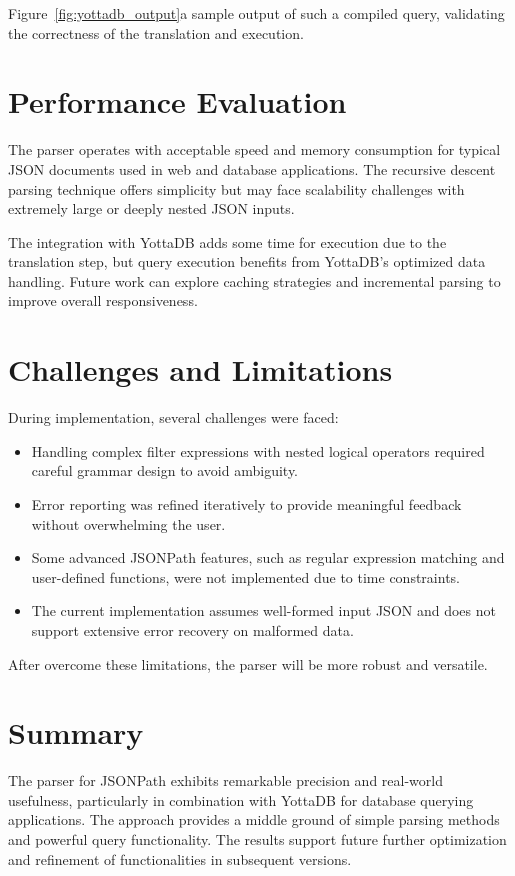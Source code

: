Figure~\ref{fig:yottadb_output}a sample output of such a compiled query, validating the correctness of the translation and execution.

\section{Performance Evaluation}

The parser operates with acceptable speed and memory consumption for typical JSON documents used in web and database applications. The recursive descent parsing technique offers simplicity but may face scalability challenges with extremely large or deeply nested JSON inputs.

The integration with YottaDB adds some time for execution due to the translation step, but query execution benefits from YottaDB’s optimized data handling. Future work can explore caching strategies and incremental parsing to improve overall responsiveness.

\section{Challenges and Limitations}

During implementation, several challenges were faced:

\begin{itemize}
	\item Handling complex filter expressions with nested logical operators required careful grammar design to avoid ambiguity.
	\item Error reporting was refined iteratively to provide meaningful feedback without overwhelming the user.
	\item Some advanced JSONPath features, such as regular expression matching and user-defined functions, were not implemented due to time constraints.
	\item The current implementation assumes well-formed input JSON and does not support extensive error recovery on malformed data.
\end{itemize}

After overcome these limitations, the parser will be more robust and versatile.

\section{Summary}

The parser for JSONPath exhibits remarkable precision and real-world usefulness, particularly in combination with YottaDB for database querying applications. The approach provides a middle ground of simple parsing methods and powerful query functionality. The results support future further optimization and refinement of functionalities in subsequent versions.

